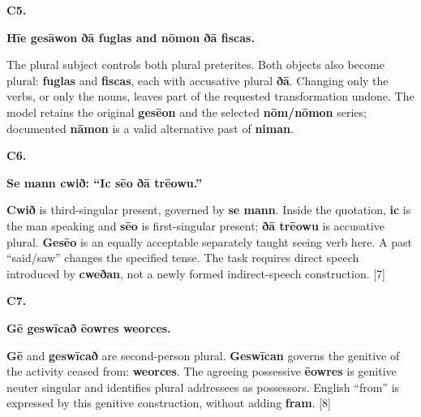 \par\begin{minipage}{\linewidth}\raggedright
\textbf{C5.}

\textbf{Hīe gesāwon ðā fuglas and nōmon ðā fiscas.}

The plural subject controls both plural preterites. Both objects also become plural: \textbf{fuglas} and \textbf{fiscas}, each with accusative plural \textbf{ðā}. Changing only the verbs, or only the nouns, leaves part of the requested transformation undone. The model retains the original \textbf{gesēon} and the selected \textbf{nōm/\allowbreak{}nōmon} series; documented \textbf{nāmon} is a valid alternative past of \textbf{niman}.

\end{minipage}\par\addvspace{4pt}

\par\begin{minipage}{\linewidth}\raggedright
\textbf{C6.}

\textbf{Se mann cwið: “Ic sēo ðā trēowu.”}

\textbf{Cwið} is third-singular present, governed by \textbf{se mann}. Inside the quotation, \textbf{ic} is the man speaking and \textbf{sēo} is first-singular present; \textbf{ðā trēowu} is accusative plural. \textbf{Gesēo} is an equally acceptable separately taught seeing verb here. A past “said/\allowbreak{}saw” changes the specified tense. The task requires direct speech introduced by \textbf{cweðan}, not a newly formed indirect-speech construction. [7]

\end{minipage}\par\addvspace{4pt}

\par\begin{minipage}{\linewidth}\raggedright
\textbf{C7.}

\textbf{Gē geswīcað ēowres weorces.}

\textbf{Gē} and \textbf{geswīcað} are second-person plural. \textbf{Geswīcan} governs the genitive of the activity ceased from: \textbf{weorces}. The agreeing possessive \textbf{ēowres} is genitive neuter singular and identifies plural addressees as possessors. English “from” is expressed by this genitive construction, without adding \textbf{fram}. [8]

\end{minipage}\par\addvspace{4pt}

